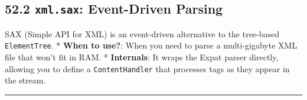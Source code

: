 \hypertarget{xml.sax-event-driven-parsing}{%
\subsection{\texorpdfstring{52.2 \texttt{xml.sax}: Event-Driven
Parsing}{52.2 xml.sax: Event-Driven Parsing}}\label{xml.sax-event-driven-parsing}}

SAX (Simple API for XML) is an event-driven alternative to the
tree-based \passthrough{\lstinline!ElementTree!}. * \textbf{When to
use?}: When you need to parse a multi-gigabyte XML file that won't fit
in RAM. * \textbf{Internals}: It wraps the Expat parser directly,
allowing you to define a \passthrough{\lstinline!ContentHandler!} that
processes tags as they appear in the stream.

\begin{center}\rule{0.5\linewidth}{0.5pt}\end{center}
